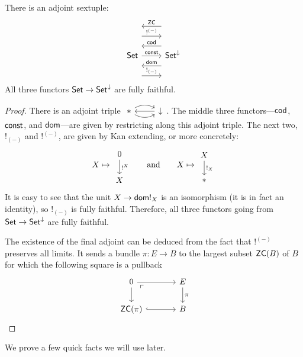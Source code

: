 \begin{prop}\label{prop:adjoint.sextuple}
  There is an adjoint sextuple:
  \[
    \begin{tikzcd}
      \Set \arrow[r, "\const"] \arrow[r, leftarrow, shift left = 5,
      "\term{cod}"] \arrow[r, leftarrow, shift right = 5, "\term{dom}"]
      \arrow[r, shift left = 10, "!^{(-)}"]  \arrow[r, shift right = 10,
      "!_{(-)}"] \arrow[r, leftarrow, shift left = 15, "\term{ZC}"]& \Set^{\down}
    \end{tikzcd}
  \]
  All three functors $\operatorname{\mathsf{{Set}}} \to \operatorname{\mathsf{{Set}}}^{\mathbin{\downarrow}}$ are fully faithful.
\end{prop}
\begin{proof}
There is an adjoint triple $\begin{tikzcd} \ast \arrow[r,leftarrow] \arrow[r,
  bend left] \arrow[r, bend right] & \down \end{tikzcd}$. The middle three
functors---$\mathsf{{cod}}$, $\mathsf{{const}}$, and $\mathsf{{dom}}$---are given by restricting along this adjoint triple. The next two, $!_{(-)}$ and $!^{(-)}$, are
given by Kan extending, or more concretely:
  \begin{equation}\label{eqn.bangbang}
  X \mapsto \begin{tikzcd} 0 \arrow[d, "!^X"] \\ X \end{tikzcd}
  \qquad\text{and}\qquad
  X \mapsto \begin{tikzcd} X \arrow[d, "!_X"] \\ \ast \end{tikzcd}
  \end{equation}
 It is easy to see that the unit $X \to \mathsf{{dom}} !_{X}$ is an isomorphism (it is in
fact an identity), so $!_{(-)}$ is fully faithful. Therefore, all three functors
going from $\operatorname{\mathsf{{Set}}} \to \operatorname{\mathsf{{Set}}}^{\mathbin{\downarrow}}$ are fully faithful.

The existence of the final adjoint can be deduced from the fact that $!^{(-)}$ preserves all
limits. It sends a bundle $\pi : E \to B$ to the largest subset $\mathsf{{ZC}}(B)$ of $B$ for
which the following square is a pullback
\[
  \begin{tikzcd}[column sep=large]
0 \arrow[r] \arrow[d] \arrow[dr, phantom,
"\ulcorner" very near start] & E \arrow[d, "\pi"] \\
\term{ZC}(\pi) \arrow[r, hookrightarrow]                                       & B
\end{tikzcd}
\]
\end{proof}
We prove a few quick facts we will use later.
